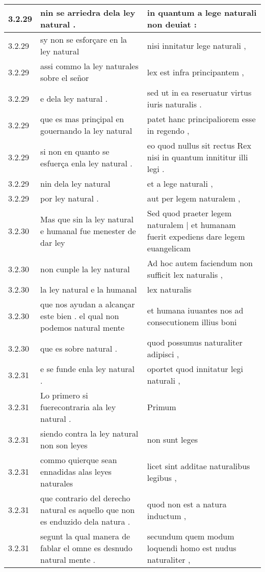 \begin{tabular}{|p{1cm}|p{6.5cm}|p{6.5cm}|}
3.2.29 & nin se arriedra dela ley natural . & in quantum a lege naturali non deuiat : \\\hline
3.2.29 & sy non se esforçare en la ley natural & nisi innitatur lege naturali , \\\hline
3.2.29 & assi commo la ley naturales sobre el señor & lex est infra principantem , \\\hline
3.2.29 & e dela ley natural . & sed ut in ea reseruatur virtus iuris naturalis . \\\hline
3.2.29 & que es mas prinçipal en gouernando la ley natural & patet hanc principaliorem esse in regendo , \\\hline
3.2.29 & si non en quanto se esfuerça enla ley natural . & eo quod nullus sit rectus Rex nisi in quantum innititur illi legi . \\\hline
3.2.29 & nin dela ley natural & et a lege naturali , \\\hline
3.2.29 & por ley natural . & aut per legem naturalem , \\\hline
3.2.30 & Mas que sin la ley natural e humanal fue menester de dar ley & Sed quod praeter legem naturalem | et humanam fuerit expediens dare legem euangelicam \\\hline
3.2.30 & non cunple la ley natural & Ad hoc autem faciendum non sufficit lex naturalis , \\\hline
3.2.30 & la ley natural e la humanal & lex naturalis \\\hline
3.2.30 & que nos ayudan a alcançar este bien . el qual non podemos natural mente & et humana iuuantes nos ad consecutionem illius boni \\\hline
3.2.30 & que es sobre natural . & quod possumus naturaliter adipisci , \\\hline
3.2.31 & e se funde enla ley natural . & oportet quod innitatur legi naturali , \\\hline
3.2.31 & Lo primero si fuerecontraria ala ley natural . & Primum \\\hline
3.2.31 & siendo contra la ley natural non son leyes & non sunt leges \\\hline
3.2.31 & commo quierque sean ennadidas alas leyes naturales & licet sint additae naturalibus legibus , \\\hline
3.2.31 & que contrario del derecho natural es aquello que non es enduzido dela natura . & quod non est a natura inductum , \\\hline
3.2.31 & segunt la qual manera de fablar el omne es desnudo natural mente . & secundum quem modum loquendi homo est nudus naturaliter , \\\hline

\end{tabular}
